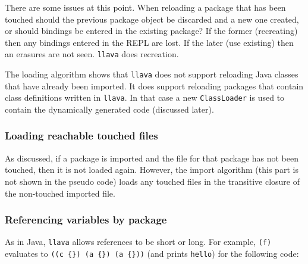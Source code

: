 \documentclass{acm-final/sig-alternate-modified}
\begin{document}
There are some issues at this point.  When reloading a package that
has been touched should the previous package object be discarded and a
new one created, or should bindings be entered in the existing
package?  If the former (recreating) then any bindings entered in the
REPL are lost.  If the later (use existing) then an erasures are not
seen.  {\tt llava} does recreation.

The loading algorithm shows that {\tt llava} does not support
reloading Java classes that have already been imported.  It does
support reloading packages that contain class definitions written in
{\tt llava}.  In that case a new {\tt ClassLoader} is used to contain
the dynamically generated code (discussed later).

\subsubsection{Loading reachable touched files}

As discussed, if a package is imported and the file for that package
has not been touched, then it is not loaded again.  However, the
import algorithm (this part is not shown in the pseudo code) loads any
touched files in the transitive closure of the non-touched imported
file.

\subsubsection{Referencing variables by package}

As in Java, {\tt llava} allows references to be short or long.  For
example, {\tt (f)} evaluates to \verb+((c {}) (a {}) (a {}))+ (and
prints {\tt hello}) for the following code:
\end{document}
